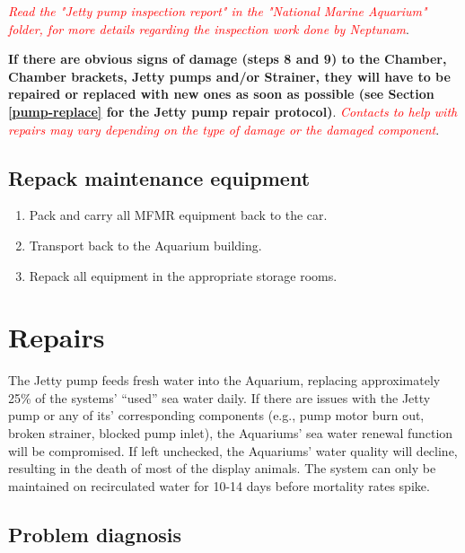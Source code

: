 \documentclass[
  12pt,
]{report}
\providecommand{\tightlist}{%
  \setlength{\itemsep}{0pt}\setlength{\parskip}{0pt}}\usepackage{longtable,booktabs,array}
\begin{document}
\emph{\textcolor{red}{Read the "Jetty pump inspection report" in the "National Marine Aquarium" folder, for more details regarding the inspection work done by Neptunam}}.

\textbf{If there are obvious signs of damage (steps 8 and 9) to the
Chamber, Chamber brackets, Jetty pumps and/or Strainer, they will have
to be repaired or replaced with new ones as soon as possible (see
Section \ul{\textcolor{blue}{\ref{pump-replace}}} for the Jetty pump
repair protocol)}.
\emph{\textcolor{red}{Contacts to help with repairs may vary depending on the type of damage or the damaged component}}.

\hypertarget{repack-maintenance-equipment}{%
\subsection{Repack maintenance
equipment}\label{repack-maintenance-equipment}}

\begin{enumerate}
\def\labelenumi{\arabic{enumi}.}
\setcounter{enumi}{13}
\tightlist
\item
  Pack and carry all MFMR equipment back to the car.
\item
  Transport back to the Aquarium building.
\item
  Repack all equipment in the appropriate storage rooms.
\end{enumerate}

\hypertarget{repairs-2}{%
\section{Repairs}\label{repairs-2}}

The Jetty pump feeds fresh water into the Aquarium, replacing
approximately 25\% of the systems' ``used'' sea water daily. If there
are issues with the Jetty pump or any of its' corresponding components
(e.g., pump motor burn out, broken strainer, blocked pump inlet), the
Aquariums' sea water renewal function will be compromised. If left
unchecked, the Aquariums' water quality will decline, resulting in the
death of most of the display animals. The system can only be maintained
on recirculated water for 10-14 days before mortality rates spike.

\hypertarget{problem-diagnosis-2}{%
\subsection{Problem diagnosis}\label{problem-diagnosis-2}}
\end{document}
